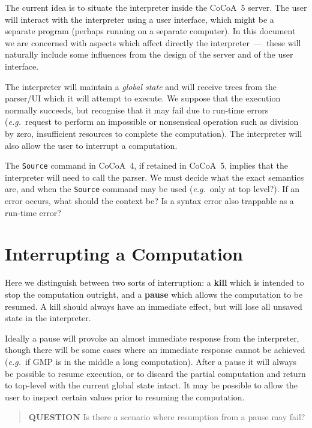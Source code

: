 \documentclass{book}[12,a4paper]
\def\eg{{\it e.g.}}
\begin{document}
The current idea is to situate the interpreter inside the
CoCoA~5 server.  The user will interact with the interpreter using a
user interface, which might be a separate program (perhaps running on a
separate computer).  In this document we are concerned with aspects which
affect directly the interpreter~---~these will naturally include some
influences from the design of the server and of the user interface.

\bigskip

The interpreter will maintain a {\it global state\/} and will receive
trees from the parser/UI which it will attempt to execute.  We suppose
that the execution normally succeeds, but recognise that it may fail
due to run-time errors (\eg~request to perform an impossible or nonsensical
operation such as division by zero, insufficient resources to complete
the computation).  The interpreter will also allow the user to interrupt
a computation.

The \texttt{Source} command in CoCoA~4, if retained in CoCoA~5, implies that
the interpreter will need to call the parser.  We must decide what the
exact semantics are, and when the \texttt{Source} command may be used (\eg~only
at top level?).  If an error occurs, what should the context be?
Is a syntax error also trappable as a run-time error?

\section{Interrupting a Computation}

Here we distinguish between two sorts of interruption: a {\bf kill} which is intended to
stop the computation outright, and a {\bf pause} which allows the computation to be resumed.
A kill should always have an immediate effect, but will lose all unsaved
state in the interpreter.

Ideally a pause will provoke an almost immediate response from
the interpreter, though there will be some cases where an immediate
response cannot be achieved (\eg~if GMP is in the middle a long computation).
After a pause it will always be possible to resume execution,
or to discard the partial computation and return to top-level with the
current global state intact.  It may be possible to allow the user to
inspect certain values prior to resuming the computation.

\begin{quote}
  {\bf QUESTION} Is there a scenario where resumption from  a pause may fail?
\end{quote}
\end{document}

